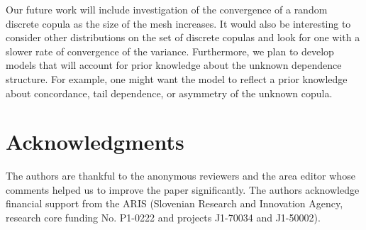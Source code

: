 \documentclass[12pt,a4paper]{amsart}
\theoremstyle{definition}
\begin{document}
Our future work will include investigation of the convergence of a random discrete copula as the size of the mesh increases. It would also be interesting to consider other distributions on the set of discrete copulas and look for one with a slower rate of convergence of the variance.
Furthermore, we plan to develop models that will account for prior knowledge about the unknown dependence structure. For example, one might want the model to reflect a prior knowledge about concordance, tail dependence, or asymmetry of the unknown copula.

\section*{Acknowledgments}

The authors are thankful to the anonymous reviewers and the area editor whose comments helped us to improve the paper significantly.
The authors acknowledge financial support from the ARIS (Slovenian Research and Innovation Agency, research core funding No. P1-0222 and projects J1-70034 and J1-50002).






\end{document}
